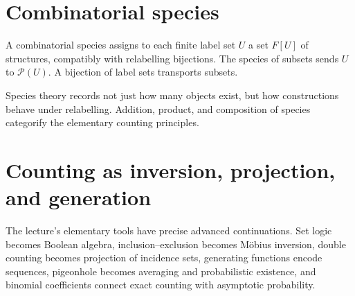 \section{Combinatorial species}

A combinatorial species assigns to each finite label set \(U\) a set \(F[U]\) of structures, compatibly with relabelling bijections.  The species of subsets sends \(U\) to \(\mathcal P(U)\).  A bijection of label sets transports subsets.

Species theory records not just how many objects exist, but how constructions behave under relabelling.  Addition, product, and composition of species categorify the elementary counting principles.

\section{Counting as inversion, projection, and generation}

The lecture's elementary tools have precise advanced continuations.  Set logic becomes Boolean algebra, inclusion--exclusion becomes Möbius inversion, double counting becomes projection of incidence sets, generating functions encode sequences, pigeonhole becomes averaging and probabilistic existence, and binomial coefficients connect exact counting with asymptotic probability.
